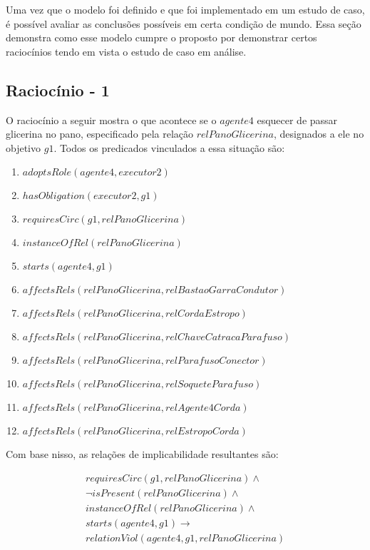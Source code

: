 \label{racs}

Uma vez que o modelo foi definido e que foi implementado em um estudo de caso, é possível avaliar as conclusões possíveis em certa condição de mundo. Essa seção demonstra como esse modelo cumpre o proposto por demonstrar certos raciocínios tendo em vista o estudo de caso em análise. 

\subsection{Raciocínio - 1} 
\label{raciocinio1}

O raciocínio a seguir mostra o que acontece se o $agente4$ esquecer de passar glicerina no pano, especificado pela relação $relPanoGlicerina$, designados a ele no objetivo $g1$. 
Todos os predicados vinculados a essa situação são:

\begin{enumerate}
	\item $adoptsRole(agente4,executor2)$ 
	\item $hasObligation(executor2,g1)$
	\item $requiresCirc(g1,relPanoGlicerina)$
	\item $instanceOfRel(relPanoGlicerina)$ 
	\item $starts(agente4,g1)$
	\item $affectsRels(relPanoGlicerina,relBastaoGarraCondutor)$
	\item $affectsRels(relPanoGlicerina,relCordaEstropo)$  
	\item $affectsRels(relPanoGlicerina,relChaveCatracaParafuso)$
	\item $affectsRels(relPanoGlicerina,relParafusoConector)$ 
	\item $affectsRels(relPanoGlicerina,relSoqueteParafuso)$ 
	\item $affectsRels(relPanoGlicerina,relAgente4Corda)$ 
	\item $affectsRels(relPanoGlicerina,relEstropoCorda)$	
\end{enumerate}

Com base nisso, as relações de implicabilidade resultantes são:

\begin{eqnarray}\nonumber
	requiresCirc(g1,relPanoGlicerina) \wedge \nonumber \\  
	\neg isPresent(relPanoGlicerina) \wedge \nonumber \\   
	instanceOfRel(relPanoGlicerina) \wedge \nonumber \\   
	starts(agente4,g1) \to \nonumber \\
	relationViol(agente4,g1,relPanoGlicerina) \nonumber \\  
\end{eqnarray}

